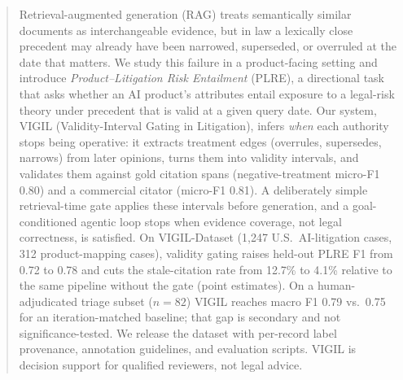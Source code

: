 \begin{abstract}
Retrieval-augmented generation (RAG) treats semantically similar documents as interchangeable evidence, but in law a lexically close precedent may already have been narrowed, superseded, or overruled at the date that matters. We study this failure in a product-facing setting and introduce \emph{Product--Litigation Risk Entailment} (PLRE), a directional task that asks whether an AI product's attributes entail exposure to a legal-risk theory under precedent that is valid at a given query date. Our system, VIGIL (Validity-Interval Gating in Litigation), infers \emph{when} each authority stops being operative: it extracts treatment edges (overrules, supersedes, narrows) from later opinions, turns them into validity intervals, and validates them against gold citation spans (negative-treatment micro-F1 0.80) and a commercial citator (micro-F1 0.81). A deliberately simple retrieval-time gate applies these intervals before generation, and a goal-conditioned agentic loop stops when evidence coverage, not legal correctness, is satisfied. On VIGIL-Dataset (1{,}247 U.S.\ AI-litigation cases, 312 product-mapping cases), validity gating raises held-out PLRE F1 from 0.72 to 0.78 and cuts the stale-citation rate from 12.7\% to 4.1\% relative to the same pipeline without the gate (point estimates). On a human-adjudicated triage subset ($n{=}82$) VIGIL reaches macro F1 0.79 vs.\ 0.75 for an iteration-matched baseline; that gap is secondary and not significance-tested. We release the dataset with per-record label provenance, annotation guidelines, and evaluation scripts. VIGIL is decision support for qualified reviewers, not legal advice.
\end{abstract}
